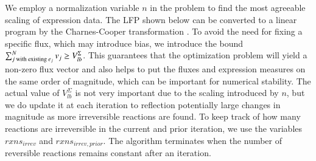 We employ a normalization variable $n$ in the problem to find the most
agreeable scaling of expression data. The LFP shown below can be
converted to a linear program by the Charnes-Cooper transformation
\citep{Boyd2004}. To avoid the need for fixing a specific flux, which
may introduce bias, we introduce the bound $\sum_{j \textnormal{ with
    existing\ } e_j}^N v_j \geq V_{lb}^{\Sigma}$. This guarantees that
the optimization problem will yield a non-zero flux vector and also
helps to put the fluxes and expression measures on the same order of
magnitude, which can be important for numerical stability. The actual
value of $V_{lb}^{\Sigma}$ is not very important due to the scaling
introduced by $n$, but we do update it at each iteration to reflection
potentially large changes in magnitude as more irreversible reactions
are found. To keep track of how many reactions are irreversible in the
current and prior iteration, we use the variables $rxns_{irrev}$ and
$rxns_{irrev,prior}$. The algorithm terminates when the number of
reversible reactions remains constant after an iteration.

